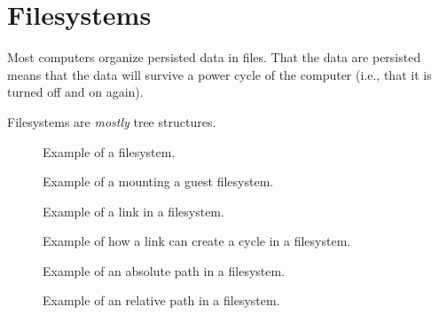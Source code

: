 \section{Filesystems}

Most computers organize persisted data in files. That the data are persisted means that the data will survive a power cycle of the computer (i.e., that it is turned off and on again).

Filesystems are \textsl{mostly} tree structures.

\begin{figure}[tbp]
  
  \caption{Example of a filesystem.}
  \label{fig:bs:fs}
\end{figure}

\begin{figure}[tbp]
  
  \caption{Example of a mounting a guest filesystem.}
  \label{fig:bs:fs:mounting}
\end{figure}

\begin{figure}[tbp]
  
  \caption{Example of a link in a filesystem.}
  \label{fig:bs:fs:links}
\end{figure}

\begin{figure}[tbp]
  
  \caption{Example of how a link can create a cycle in a filesystem.}
  \label{fig:bs:fs:cycles}
\end{figure}

\begin{figure}[tbp]
  
  \caption{Example of an absolute path in a filesystem.}
  \label{fig:bs:fs:path:abs}
\end{figure}

\begin{figure}[tbp]
  
  \caption{Example of an relative path in a filesystem.}
  \label{fig:bs:fs:path:rel}
\end{figure}

